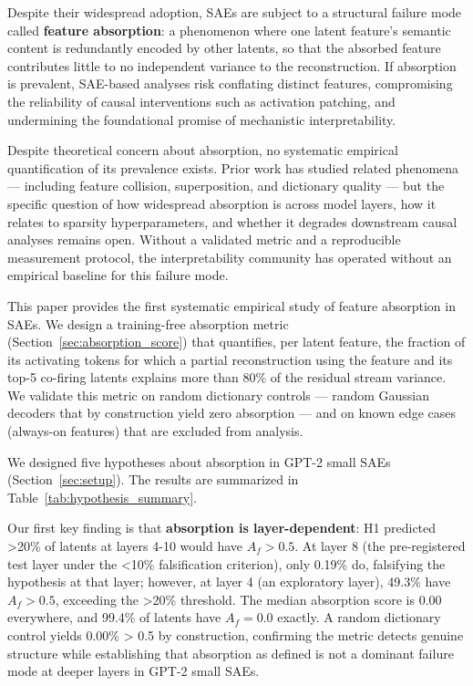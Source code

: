 \documentclass{article}
\begin{document}
Despite their widespread adoption, SAEs are subject to a structural failure mode called \textbf{feature absorption}: a phenomenon where one latent feature's semantic content is redundantly encoded by other latents, so that the absorbed feature contributes little to no independent variance to the reconstruction. If absorption is prevalent, SAE-based analyses risk conflating distinct features, compromising the reliability of causal interventions such as activation patching, and undermining the foundational promise of mechanistic interpretability.

Despite theoretical concern about absorption, no systematic empirical quantification of its prevalence exists. Prior work has studied related phenomena --- including feature collision, superposition, and dictionary quality --- but the specific question of how widespread absorption is across model layers, how it relates to sparsity hyperparameters, and whether it degrades downstream causal analyses remains open. Without a validated metric and a reproducible measurement protocol, the interpretability community has operated without an empirical baseline for this failure mode.

This paper provides the first systematic empirical study of feature absorption in SAEs. We design a training-free absorption metric (Section~\ref{sec:absorption_score}) that quantifies, per latent feature, the fraction of its activating tokens for which a partial reconstruction using the feature and its top-5 co-firing latents explains more than 80\% of the residual stream variance. We validate this metric on random dictionary controls --- random Gaussian decoders that by construction yield zero absorption --- and on known edge cases (always-on features) that are excluded from analysis.

We designed five hypotheses about absorption in GPT-2 small SAEs (Section~\ref{sec:setup}). The results are summarized in Table~\ref{tab:hypothesis_summary}.

Our first key finding is that \textbf{absorption is layer-dependent}: H1 predicted >20\% of latents at layers 4-10 would have $A_f > 0.5$. At layer 8 (the pre-registered test layer under the <10\% falsification criterion), only 0.19\% do, falsifying the hypothesis at that layer; however, at layer 4 (an exploratory layer), 49.3\% have $A_f > 0.5$, exceeding the >20\% threshold. The median absorption score is 0.00 everywhere, and 99.4\% of latents have $A_f = 0.0$ exactly. A random dictionary control yields 0.00\% > 0.5 by construction, confirming the metric detects genuine structure while establishing that absorption as defined is not a dominant failure mode at deeper layers in GPT-2 small SAEs.
\end{document}
